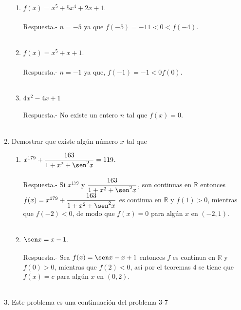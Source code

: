 \begin{enumerate}[\bfseries 1.]
\begin{enumerate}[\bfseries (i)]
	\item $f(x) = x^5+5x^4 + 2x + 1$.\\\\
	    Respuesta.-\; $n=-5$ ya que $f(-5) = -11<0<f(-4)$.\\\\

	\item $f(x) = x^5 + x + 1$.\\\\
	    Respuesta.-\; $n=-1$ ya que, $f(-1) = -1<0f(0)$.\\\\ 

	\item $4x^2-4x+1$\\\\
	    Respuesta.-\; No existe un entero $n$ tal que $f(x)=0$.\\\\

    \end{enumerate}

\item Demostrar que existe algún número $x$ tal que

    \begin{enumerate}[\bfseries (i)]

	\item $x^{179} + \dfrac{163}{1+x^2+\sen^2 x} = 119$.\\\\
	    Respuesta.-\; Si $x^{179}$  y  $\dfrac{163}{1+x^2+\sen^2 x}$, son continuas en $\mathbb{R}$ entonces $f(x) = x^{179}+\dfrac{163}{1+x^2+\sen^2 x}$ es continua en $\mathbb{R}$ y $f(1)>0$, mientras que $f(-2)<0$, de modo que $f(x)=0$ para algún $x$ en $(-2,1)$.\\\\

	\item $\sen x =x-1.$\\\\
	    Respuesta.-\; Sea $f(x) = \sen x - x + 1$ entonces $f$ es continua en $\mathbb{R}$ y $f(0)>0$, mientras que $f(2)<0$, así por el teoremas 4 se tiene que $f(x)=c$ para algún $x$ en $(0,2)$.\\\\

    \end{enumerate}

\item Este problema es una continuación del problema 3-7
    \begin{enumerate}[\bfseries (a)]


\end{enumerate}
\end{enumerate}
